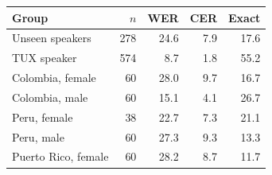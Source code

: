 \begin{tabular}{lrrrr}
\toprule
Group & $n$ & WER & CER & Exact \\
\midrule
Unseen speakers & 278 & 24.6 & 7.9 & 17.6 \\
TUX speaker & 574 & 8.7 & 1.8 & 55.2 \\
Colombia, female & 60 & 28.0 & 9.7 & 16.7 \\
Colombia, male & 60 & 15.1 & 4.1 & 26.7 \\
Peru, female & 38 & 22.7 & 7.3 & 21.1 \\
Peru, male & 60 & 27.3 & 9.3 & 13.3 \\
Puerto Rico, female & 60 & 28.2 & 8.7 & 11.7 \\
\bottomrule
\end{tabular}
